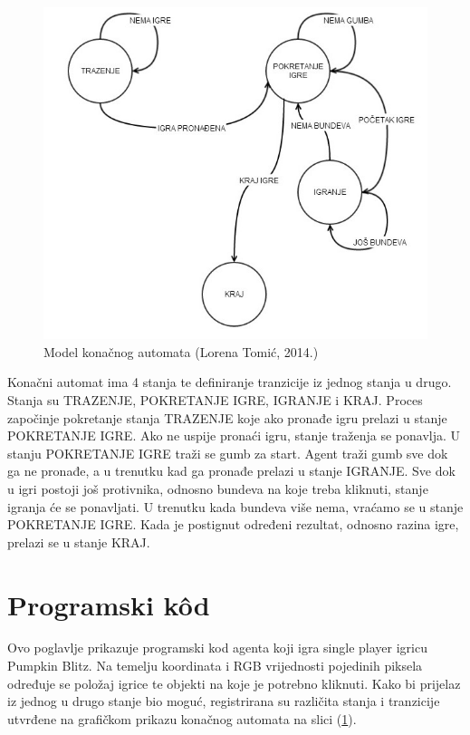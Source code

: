 \documentclass[a4paper,12pt]{foi}
\begin{document}
\begin{figure}[h]
\centering 
\includegraphics[width=1\textwidth]{model.png}
\caption{Model konačnog automata (Lorena Tomić, 2014.)}
\label{slika-1}
\end{figure}
\newpage
Konačni automat ima 4 stanja te definiranje tranzicije iz jednog stanja u drugo. Stanja su TRAZENJE, POKRETANJE IGRE, IGRANJE i KRAJ. Proces započinje pokretanje stanja TRAZENJE koje ako pronađe igru prelazi u stanje POKRETANJE IGRE. Ako ne uspije pronaći igru, stanje traženja se ponavlja. U stanju POKRETANJE IGRE traži se gumb za start. Agent traži gumb sve dok ga ne pronađe, a u trenutku kad ga pronađe prelazi u stanje IGRANJE. Sve dok u igri postoji još protivnika, odnosno bundeva na koje treba kliknuti, stanje igranja će se ponavljati. U trenutku kada bundeva više nema, vraćamo se u stanje POKRETANJE IGRE. Kada je postignut određeni rezultat, odnosno razina igre, prelazi se u stanje KRAJ.

\chapter{Programski k\^{o}d}

Ovo poglavlje prikazuje programski kod agenta koji igra single player igricu Pumpkin Blitz. Na temelju koordinata i RGB vrijednosti pojedinih piksela određuje se položaj igrice te objekti na koje je potrebno kliknuti. Kako bi prijelaz iz jednog u drugo stanje bio moguć, registrirana su različita stanja i tranzicije utvrđene  na grafičkom prikazu konačnog automata na slici (\ref{slika-1}).
\end{document}
